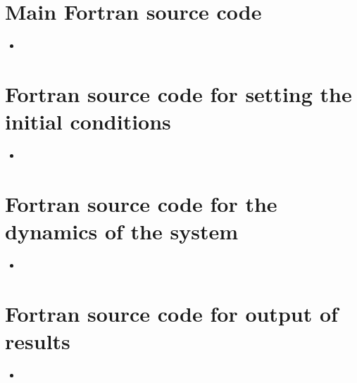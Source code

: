 \documentclass[
10pt, %
a4paper, %
oneside, %
headinclude,footinclude, %
BCOR5mm, %
]{scrartcl}
\newcommand{\insertcode}[2]{\begin{itemize}\item[]\end{itemize}} %
\begin{document}
\newpage

\begin{appendices}

\section{Main Fortran source code}


\insertcode{"../argon_box.f90"}{argon\_box.f90} %


\newpage


\section{Fortran source code for setting the initial conditions}


\insertcode{"../argon_box_init.f90"}{argon\_box\_init.f90} %


\newpage


\section{Fortran source code for the dynamics of the system}


\insertcode{"../argon_box_dynamics.f90"}{argon\_box\_dynamics.f90} %


\newpage


\section{Fortran source code for output of results}


\insertcode{"../argon_box_results.f90"}{argon\_box\_results.f90} %


\newpage

\end{appendices}
\end{document}
